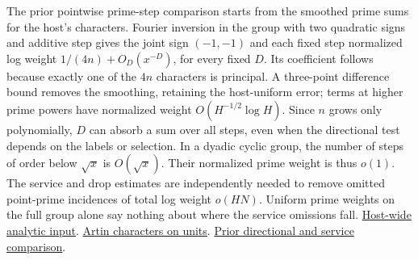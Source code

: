 The prior pointwise prime-step comparison starts from the smoothed prime sums for the host's characters. Fourier inversion in the group with two quadratic signs and additive step gives the joint sign \((-1,-1)\) and each fixed step normalized log weight \(1/(4n)+O_D(x^{-D})\), for every fixed \(D\). Its coefficient follows because exactly one of the \(4n\) characters is principal. A three-point difference bound removes the smoothing, retaining the host-uniform error; terms at higher prime powers have normalized weight \(O(H^{-1/2}\log H)\). Since \(n\) grows only polynomially, \(D\) can absorb a sum over all steps, even when the directional test depends on the labels or selection. In a dyadic cyclic group, the number of steps of order below \(\sqrt{x}\) is \(O(\sqrt{x})\). Their normalized prime weight is thus \(o(1)\). The service and drop estimates are independently needed to remove omitted point-prime incidences of total log weight \(o(HN)\). Uniform prime weights on the full group alone say nothing about where the service omissions fall.
\href{https://github.com/nousentllc/riemann-hypothesis/blob/40e56bab026552e089d7afcfeff08d2defb9c005/src/Formalism/SharpRestriction/GlobalSchurBounds/Chosen.lean#L46-L51}{Host-wide analytic input}.
\href{https://github.com/nousentllc/riemann-hypothesis/blob/40e56bab026552e089d7afcfeff08d2defb9c005/src/Formalism/SharpRestriction/GlobalSchurBounds/Joints.lean#L855-L883}{Artin characters on units}.
\href{https://github.com/nousentllc/riemann-hypothesis/blob/ab18d856b6989f7bcb05e486ca720aa9016f3268/research/uriel/experiments/odd-position-study/evidence/FAMILY.md}{Prior directional and service comparison}.


